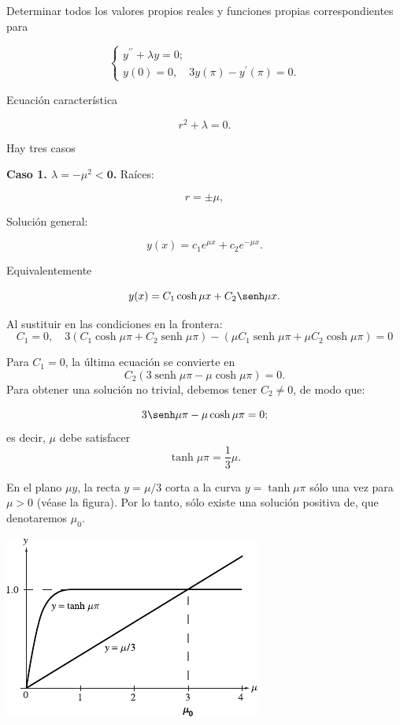  

\begin{ejemplo}{}  Determinar todos los valores propios reales y funciones propias correspondientes para
 
 $$
\left\{\begin{array}{l}
            y^{\prime \prime}+\lambda y=0;\\
            y(0)=0, \quad 3 y(\pi)-y^{\prime}(\pi)=0.
\end{array} \right.
$$

\end{ejemplo}

  Ecuación característica 

$$r^{2}+\lambda=0.$$

Hay tres casos

\textbf{Caso 1. $\lambda=-\mu^{2}<\mathbf{0}$.} Raíces:

$$r=\pm \mu,$$

Solución general:

$$y(x)=c_{1} e^{\mu x}+c_{2} e^{-\mu x}.$$ 


Equivalentemente 

$$y(x)=C_{1} \cosh \mu x+C_{2} \senh \mu x.$$

Al sustituir en las condiciones en la frontera:
$$
C_{1}=0, \quad 3\left(C_{1} \cosh \mu \pi+C_{2} \operatorname{senh} \mu \pi\right)-\left(\mu C_{1} \operatorname{senh} \mu \pi+\mu C_{2} \cosh \mu \pi\right)=0
$$

Para $C_{1}=0$, la última ecuación se convierte en
$$
C_{2}(3 \operatorname{senh} \mu \pi-\mu \cosh \mu \pi)=0 .
$$
Para obtener una solución no trivial, debemos tener $C_{2} \neq 0$, de modo que:

$$3 \senh \mu \pi-\mu\cosh \mu \pi=0;$$
es decir, $\mu$ debe satisfacer
 $$\tanh \mu \pi=\frac{1}{3} \mu.$$
 
 



En el plano $\mu y$, la recta $y=\mu / 3$ corta a la curva $y=\tanh \mu \pi$ sólo una vez para $\mu>0$ (véase la figura). Por lo tanto, sólo existe una solución positiva de, que denotaremos $\mu_{0}$.


\includegraphics[scale=.8]{imagenes/tanh.png}

